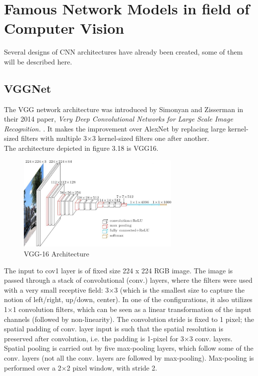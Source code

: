 \section{Famous Network Models in field of Computer Vision}
Several designs of CNN architectures have already been created, some of them will be described here.
\subsection{VGGNet}
The VGG network architecture was introduced by Simonyan and Zisserman in their 2014 paper, \textit{Very Deep Convolutional Networks for Large Scale Image Recognition.} \cite{simonyan2014very}. It makes the improvement over AlexNet by replacing large kernel-sized filters with multiple 3×3 kernel-sized filters one after another. \\
The architecture depicted in figure 3.18 is VGG16.
\begin{figure}[h]
	\includegraphics[width=0.7\textwidth]{Figures/Section3_Vgg16.jpg} 
	\centering
	\captionsetup{justification=centering}
	\caption{VGG-16 Architecture}
	\label{fig:vgg16}
\end{figure}
The input to cov1 layer is of fixed size 224 x 224 RGB image. The image is passed through a stack of convolutional (conv.) layers, where the filters were used with a very small receptive field: 3×3 (which is the smallest size to capture the notion of left/right, up/down, center). In one of the configurations, it also utilizes 1×1 convolution filters, which can be seen as a linear transformation of the input channels (followed by non-linearity). The convolution stride is fixed to 1 pixel; the spatial padding of conv. layer input is such that the spatial resolution is preserved after convolution, i.e. the padding is 1-pixel for 3×3 conv. layers. Spatial pooling is carried out by five max-pooling layers, which follow some of the conv.  layers (not all the conv. layers are followed by max-pooling). Max-pooling is performed over a 2×2 pixel window, with stride 2.

